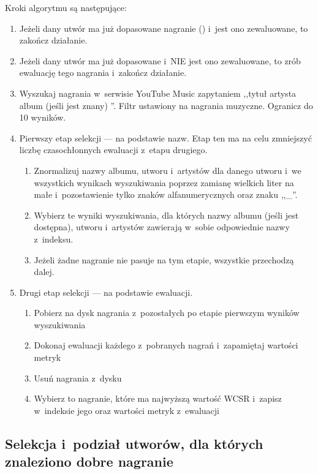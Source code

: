 Kroki algorytmu są następujące:
\begin{enumerate}
    \item Jeżeli dany utwór ma już dopasowane nagranie () i~jest ono zewaluowane, to
        zakończ działanie.
    \item Jeżeli dany utwór ma już dopasowane  i~NIE jest ono zewaluowane, to zrób
        ewaluację tego nagrania i~zakończ działanie.
    \item Wyszukaj nagrania w~serwisie YouTube Music zapytaniem ,,tytuł artysta album (jeśli jest
        znany) ''. Filtr ustawiony na nagrania muzyczne. Ogranicz do 10 wyników.
    \item Pierwszy etap selekcji --- na podstawie nazw. Etap ten ma na celu zmniejszyć liczbę
        czasochłonnych ewaluacji z~etapu drugiego. 
        \begin{enumerate}
            \item Znormalizuj nazwy albumu, utworu i~artystów dla danego utworu i~we wszystkich
                wynikach wyszukiwania poprzez zamianę wielkich liter na małe i~pozostawienie tylko
                znaków alfanumerycznych oraz znaku ,,\_''.
            \item Wybierz te wyniki wyszukiwania, dla których nazwy albumu (jeśli jest
                dostępna), utworu i~artystów zawierają w~sobie odpowiednie nazwy z~indeksu.
            \item Jeżeli żadne nagranie nie pasuje na tym etapie, wszystkie przechodzą dalej.
        \end{enumerate}
    \item Drugi etap selekcji --- na podstawie ewaluacji.
        \begin{enumerate}
            \item Pobierz na dysk nagrania z~pozostałych po etapie pierwszym wyników wyszukiwania
            \item Dokonaj ewaluacji każdego z~pobranych nagrań i~zapamiętaj wartości metryk
            \item Usuń nagrania z~dysku
            \item Wybierz to nagranie, które ma najwyższą wartość WCSR i~zapisz w~indeksie jego
                 oraz wartości metryk z~ewaluacji
        \end{enumerate}
\end{enumerate}

\subsection{Selekcja i~podział utworów, dla których znaleziono dobre nagranie}

